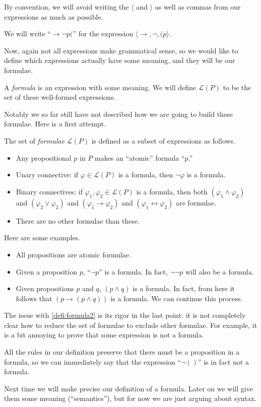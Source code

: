 \documentclass[../notes.tex]{subfiles}
\begin{document}
By convention, we will avoid writing the $\langle$ and $\rangle$ as well as commas from our expressions as much as possible.
\begin{example}
	We will write ``$\to\lnot p($'' for the expression $\langle\to,\lnot,(p\rangle$.
\end{example}
Now, again not all expressions make grammatical sense, so we would like to define which expressions actually have some meaning, and they will be our formulae.
\begin{definition}[Formula, I]
	A \textit{formula} is an expression with some meaning. We will define $\mathcal L(P)$ to be the set of these well-formed expressions.
\end{definition}
Notably we so far still have not described how we are going to build these formulae. Here is a first attempt.
\begin{definition}[Formula, II] \label{defi:formula2}
	The set of \textit{formulae} $\mathcal L(P)$ is defined as a subset of expressions as follows.
	\begin{itemize}
		\item Any propositional $p$ in $P$ makes an ``atomic'' formula ``$p$.''
		\item Unary connective: if $\varphi\in\mathcal L(P)$ is a formula, then $\lnot\varphi$ is a formula.
		\item Binary connectives: if $\varphi_1,\varphi_2\in\mathcal L(P)$ is a formula, then both $(\varphi_1\land\varphi_2)$ and $(\varphi_2\lor\varphi_2)$ and $(\varphi_1\to\varphi_2)$ and $(\varphi_1\leftrightarrow\varphi_2)$ are formulae.
		\item There are no other formulae than these.
	\end{itemize}
\end{definition}
\begin{example}
	Here are some examples.
	\begin{itemize}
		\item All propositions are atomic formulae.
		\item Given a proposition $p$, ``$\lnot p$'' is a formula. In fact, $\lnot\lnot p$ will also be a formula.
		\item Given propositions $p$ and $q$, $(p\land q)$ is a formula. In fact, from here it follows that $(p\to(p\land q))$ is a formula. We can continue this process.
	\end{itemize}
\end{example}
The issue with \autoref{defi:formula2} is its rigor in the last point: it is not completely clear how to reduce the set of formulae to exclude other formulae. For example, it is a bit annoying to prove that some expression is not a formula.
\begin{example}
	All the rules in our definition preserve that there must be a proposition in a formula, so we can immediately say that the expression ``$\lnot()$'' is in fact not a formula.
\end{example}
Next time we will make precise our definition of a formula. Later on we will give them some meaning (``semantics''), but for now we are just arguing about syntax.
\end{document}
